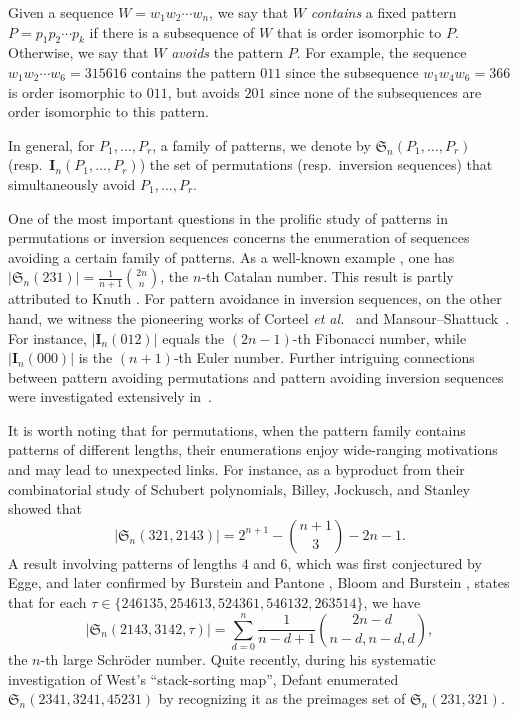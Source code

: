\documentclass[reqno]{amsart}
\numberwithin{equation}{section}
\theoremstyle{plain}
\theoremstyle{definition}
\theoremstyle{named}
\newcommand{\fS}{\mathfrak{S}}
\newcommand{\bI}{\mathbf{I}}
\begin{document}
Given a sequence $W=w_1w_2\cdots w_n$, we say that $W$ \textit{contains} a fixed pattern $P=p_1p_2\cdots p_k$ if there is a subsequence of $W$ that is order isomorphic to $P$. Otherwise, we say that $W$ \textit{avoids} the pattern $P$. For example, the sequence $w_1w_2\cdots w_6=315616$ contains the pattern $011$ since the subsequence $w_1w_4w_6=366$ is order isomorphic to $011$, but avoids $201$ since none of the subsequences are order isomorphic to this pattern.

In general, for $P_1,\ldots,P_r$, a family of patterns, we denote by $\fS_n(P_1,\ldots,P_r)$ (resp.~$\bI_n(P_1,\ldots,P_r)$) the set of permutations (resp.~inversion sequences) that simultaneously avoid $P_1,\ldots,P_r$.

One of the most important questions in the prolific study of patterns in permutations or inversion sequences concerns the enumeration of sequences avoiding a certain family of patterns. As a well-known example \cite[Proposition 2.1.3]{Kit2011}, one has $|\fS_n(231)|=\frac{1}{n+1}\binom{2n}{n}$, the $n$-th Catalan number. This result is partly attributed to Knuth \cite[pp.~242--243]{Knu1997}. For pattern avoidance in inversion sequences, on the other hand, we witness the pioneering works of Corteel \textit{et al.}~\cite{CMSW2016} and Mansour--Shattuck~\cite{MS2015}. For instance, $|\bI_n(012)|$ equals the $(2n-1)$-th Fibonacci number, while $|\bI_n(000)|$ is the $(n+1)$-th Euler  number. Further intriguing  connections between pattern avoiding permutations and pattern avoiding inversion sequences were investigated extensively in~\cite{LK2018,LK2021,Lin2020,FL2021}. 

It is worth noting that for permutations, when the pattern family contains patterns of different lengths, their enumerations enjoy wide-ranging motivations and may lead to unexpected links. For instance, as a byproduct from their combinatorial study of Schubert polynomials, Billey, Jockusch, and Stanley \cite{BJS1993} showed that
$$|\fS_n(321,2143)|=2^{n+1}-\binom{n+1}{3}-2n-1.$$
A result involving patterns of lengths $4$ and $6$, which was first conjectured by Egge, and later confirmed by Burstein and Pantone \cite{BP2015}, Bloom and Burstein \cite{BB2016}, states that for each $\tau\in\{246135,254613,\allowbreak 524361,546132,263514\}$, we have
$$|\fS_n(2143,3142,\tau)|=\sum_{d=0}^n\frac{1}{n-d+1}\binom{2n-d}{n-d,n-d,d},$$
the $n$-th large Schr\"oder number. Quite recently, during his systematic investigation of West's ``stack-sorting map'', Defant \cite{Def2021} enumerated $\fS_n(2341,3241,45231)$ by recognizing it as the preimages set of $\fS_n(231,321)$.
\end{document}
